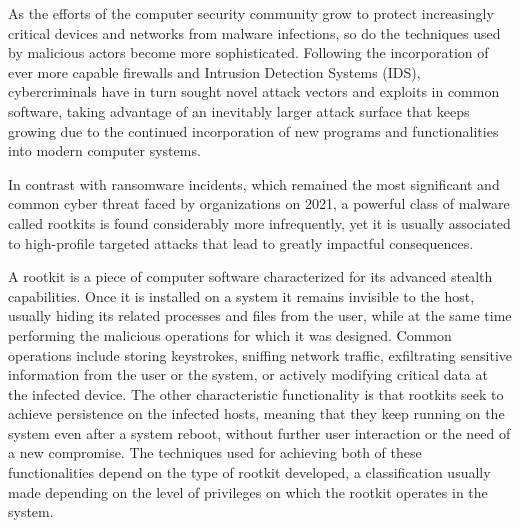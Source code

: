 \documentclass[12pt]{report} %
\begin{document}
As the efforts of the computer security community grow to protect increasingly critical devices and networks from malware infections, so do the techniques used by malicious actors become more sophisticated. Following the incorporation of ever more capable firewalls and Intrusion Detection Systems (IDS), cybercriminals have in turn sought novel attack vectors and exploits in common software, taking advantage of an inevitably larger attack surface that keeps growing due to the continued incorporation of new programs and functionalities into modern computer systems.

In contrast with ransomware incidents, which remained the most significant and common cyber threat faced by organizations on 2021\cite{ransomware_pwc}, a powerful class of malware called rootkits is found considerably more infrequently, yet it is usually associated to high-profile targeted attacks that lead to greatly impactful consequences. 

A rootkit is a piece of computer software characterized for its advanced stealth capabilities. Once it is installed on a system it remains invisible to the host, usually hiding its related processes and files from the user, while at the same time performing the malicious operations for which it was designed. Common operations include storing keystrokes, sniffing network traffic, exfiltrating sensitive information from the user or the system, or actively modifying critical data at the infected device. The other characteristic functionality is that rootkits seek to achieve persistence on the infected hosts, meaning that they keep running on the system even after a system reboot, without further user interaction or the need of a new compromise.
The techniques used for achieving both of these functionalities depend on the type of rootkit developed, a classification usually made depending on the level of privileges on which the rootkit operates in the system.
\end{document}
